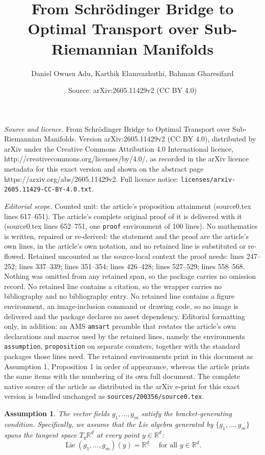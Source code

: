 \documentclass[10pt,a4paper]{amsart}
\title{From Schr\"odinger Bridge to Optimal Transport over Sub-Riemannian Manifolds}
\author{Daniel Owusu Adu, Karthik Elamvazhuthi, Bahman Gharesifard}
\date{Source: arXiv:2605.11429v2 (CC BY 4.0)}
\newtheorem{assumption}{Assumption}
\begin{document}
\maketitle

\noindent\emph{Source and licence.} From Schr\"odinger Bridge to Optimal Transport over Sub-Riemannian Manifolds. Version arXiv:2605.11429v2 (CC BY 4.0), distributed by arXiv under the Creative Commons Attribution 4.0 International licence, http://creativecommons.org/licenses/by/4.0/, as recorded in the arXiv licence metadata for this exact version and shown on the abstract page https://arxiv.org/abs/2605.11429v2. Full licence notice: \texttt{licenses/arxiv-2605.11429-CC-BY-4.0.txt}.\par\smallskip

\noindent\textit{Editorial scope.} Counted unit: the article's proposition attainment (source0.tex lines 617--651). The article's complete original proof of it is delivered with it (source0.tex lines 652--751, one \texttt{proof} environment of 100 lines). No mathematics is written, repaired or re-derived: the statement and the proof are the article's own lines, in the article's own notation, and no retained line is substituted or re-flowed.  Retained uncounted as the source-local context the proof needs: lines 247--252; lines 337--339; lines 351--354; lines 426--428; lines 527--529; lines 558--568.  Nothing was omitted from any retained span, so the package carries no omission record.  No retained line contains a citation, so the wrapper carries no bibliography and no bibliography entry.  No retained line contains a figure environment, an image-inclusion command or drawing code, so no image is delivered and the package declares no asset dependency.  Editorial formatting only, in addition: an AMS \texttt{amsart} preamble that restates the article's own declarations and macros used by the retained lines, namely the environments \texttt{assumption}, \texttt{proposition} on separate counters, together with the standard packages those lines need.  The retained environments print in this document as Assumption 1, Proposition 1 in order of appearance, whereas the article prints the same items with the numbering of its own full document.  The complete native source of the article as distributed in the arXiv e-print for this exact version is bundled unchanged as \texttt{sources/200356/source0.tex}.
\begin{assumption}\label{ass:Controllability condition}
The vector fields ${g_1, \dots, g_m}$ satisfy the bracket-generating condition. Specifically, we assume that the Lie algebra generated by $\{g_1, \dots, g_m\}$ spans the tangent space $T_y\mathbb{R}^d$ at every point $y \in \mathbb{R}^d$:
\[
\operatorname{Lie}(g_1, \dots, g_m)(y) = \mathbb{R}^d \quad \text{ for all $y \in \mathbb{R}^d$.}
\]
\end{assumption}
\end{document}
